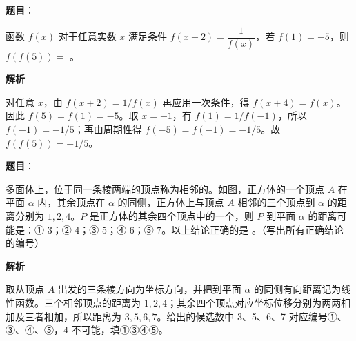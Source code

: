 \begin{answer}

\textbf{题目}：

函数 $f(x)$ 对于任意实数 $x$ 满足条件 $f(x+2)=\dfrac{1}{f(x)}$，若 $f(1)=-5$，则 $f(f(5))=$ \gkblank{}。

\textbf{解析}

对任意 $x$，由 $f(x+2)=1/f(x)$ 再应用一次条件，得 $f(x+4)=f(x)$。因此 $f(5)=f(1)=-5$。取 $x=-1$，有 $f(1)=1/f(-1)$，所以 $f(-1)=-1/5$；再由周期性得 $f(-5)=f(-1)=-1/5$。故 $f(f(5))=-1/5$。


\end{answer}
\begin{answer}

\textbf{题目}：

多面体上，位于同一条棱两端的顶点称为相邻的。如图，正方体的一个顶点 $A$ 在平面 $\alpha$ 内，其余顶点在 $\alpha$ 的同侧，正方体上与顶点 $A$ 相邻的三个顶点到 $\alpha$ 的距离分别为 $1,2,4$。$P$ 是正方体的其余四个顶点中的一个，则 $P$ 到平面 $\alpha$ 的距离可能是：① $3$；② $4$；③ $5$；④ $6$；⑤ $7$。以上结论正确的是 \gkblank{}。（写出所有正确结论的编号）
\nopagebreak[4]
\begin{center}\end{center}
\nopagebreak[4]
\textbf{解析}

取从顶点 $A$ 出发的三条棱方向为坐标方向，并把到平面 $\alpha$ 的同侧有向距离记为线性函数。三个相邻顶点的距离为 $1,2,4$；其余四个顶点对应坐标位移分别为两两相加及三者相加，所以距离为 $3,5,6,7$。给出的候选数中 3、5、6、7 对应编号①、③、④、⑤，4 不可能，填①③④⑤。


\end{answer}
